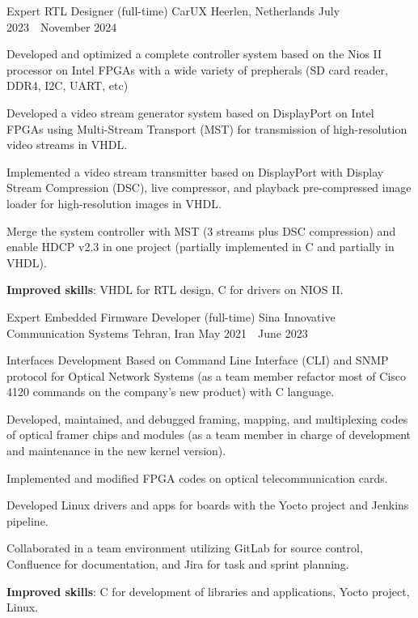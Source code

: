 \begin{cventries}
  \cventry
  {Expert RTL Designer (full-time)} %
  {CarUX} %
  {Heerlen, Netherlands } %
  {July 2023~\textendash~November 2024} %
  {
    \begin{cvitems} %
      \item {Developed and optimized a complete controller system based on the Nios II processor on Intel FPGAs with a wide variety of prepherals (SD card reader, DDR4, I2C, UART, etc)}
      \item {Developed a video stream generator system based on DisplayPort on Intel FPGAs using Multi-Stream Transport (MST) for transmission of high-resolution video streams in VHDL.}
      \item {Implemented a video stream transmitter based on DisplayPort with Display Stream Compression (DSC), live compressor, and playback pre-compressed image loader for high-resolution images in VHDL.}
      \item {Merge the system controller with MST (3 streams plus DSC compression) and enable HDCP v2.3 in one project (partially implemented in C and partially in VHDL).}
      \item {\textbf{Improved skills}: VHDL for RTL design, C for drivers on NIOS II.}
    \end{cvitems}
  }

  \cventry
    {Expert Embedded Firmware Developer (full-time)} %
    {Sina Innovative Communication Systems} %
    {Tehran, Iran} %
    {May 2021~\textendash~June 2023} %
    {
      \begin{cvitems} %
        \item {Interfaces Development Based on Command Line Interface (CLI) and SNMP protocol for Optical Network Systems (as a team member refactor most of Cisco 4120 commands on the company’s new product) with C language.}
	\item {Developed, maintained, and debugged framing, mapping, and multiplexing codes of optical framer chips and modules (as a team member in charge of development and maintenance in the new kernel version).}
        \item {Implemented and modified FPGA codes on optical telecommunication cards.}
	\item {Developed Linux drivers and apps for boards with the Yocto project and Jenkins pipeline.}
	\item {Collaborated in a team environment utilizing GitLab for source control, Confluence for documentation, and Jira for task and sprint planning.}
	\item {\textbf{Improved skills}: C for development of libraries and applications, Yocto project, Linux.}
      \end{cvitems}
    }


\end{cventries}
